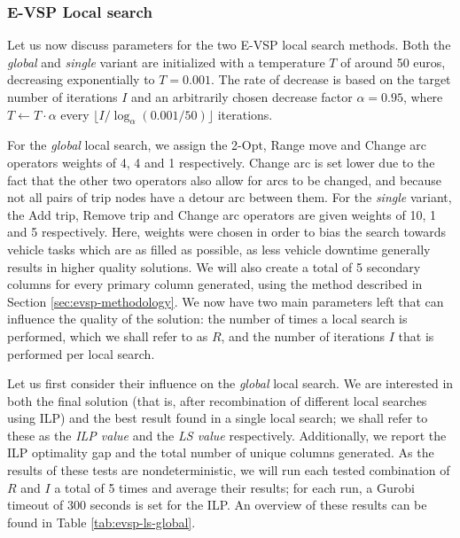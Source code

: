 \documentclass[]{article}
\begin{document}
\subsubsection{E-VSP Local search}
Let us now discuss parameters for the two E-VSP local search methods. Both the \emph{global} and \emph{single} variant are initialized with a temperature $T$ of around 50 euros, decreasing exponentially to $T = 0.001$. The rate of decrease is based on the target number of iterations $I$ and an arbitrarily chosen decrease factor $\alpha = 0.95$, where $T \gets T \cdot \alpha$ every $\lfloor I / \log_\alpha(0.001 / 50) \rfloor$ iterations. 

For the \emph{global} local search, we assign the 2-Opt, Range move and Change arc operators weights of 4, 4 and 1 respectively. Change arc is set lower due to the fact that the other two operators also allow for arcs to be changed, and because not all pairs of trip nodes have a detour arc between them. For the \emph{single} variant, the Add trip, Remove trip and Change arc operators are given weights of 10, 1 and 5 respectively. Here, weights were chosen in order to bias the search towards vehicle tasks which are as filled as possible, as less vehicle downtime generally results in higher quality solutions. We will also create a total of 5 secondary columns for every primary column generated, using the method described in Section \ref{sec:evsp-methodology}. We now have two main parameters left that can influence the quality of the solution: the number of times a local search is performed, which we shall refer to as $R$, and the number of iterations $I$ that is performed per local search. 

Let us first consider their influence on the \emph{global} local search. We are interested in both the final solution (that is, after recombination of different local searches using ILP) and the best result found in a single local search; we shall refer to these as the \textit{ILP value} and the \textit{LS value} respectively. Additionally, we report the ILP optimality gap and the total number of unique columns generated. As the results of these tests are nondeterministic, we will run each tested combination of $R$ and $I$ a total of 5 times and average their results; for each run, a Gurobi timeout of 300 seconds is set for the ILP. An overview of these results can be found in Table \ref{tab:evsp-ls-global}.
\end{document}
